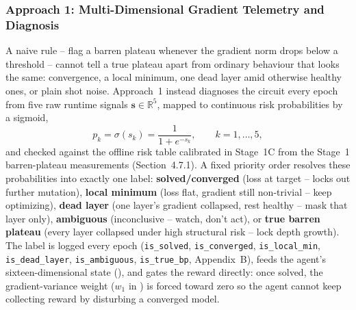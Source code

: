 \subsubsection{Approach 1: Multi-Dimensional Gradient Telemetry and Diagnosis}
A naive rule -- flag a barren plateau whenever the gradient norm drops below a threshold -- cannot tell a true plateau apart from ordinary behaviour that looks the same: convergence, a local minimum, one dead layer amid otherwise healthy ones, or plain shot noise. Approach~1 instead diagnoses the circuit every epoch from five raw runtime signals $\mathbf{s} \in \mathbb{R}^5$, mapped to continuous risk probabilities by a sigmoid,
\begin{equation}
p_k = \sigma(s_k) = \frac{1}{1+e^{-s_k}}, \qquad k = 1,\dots,5,
\end{equation}
and checked against the offline risk table calibrated in Stage~1C from the Stage~1 barren-plateau measurements (Section~4.7.1). A fixed priority order resolves these probabilities into exactly one label: \textbf{solved/converged} (loss at target -- locks out further mutation), \textbf{local minimum} (loss flat, gradient still non-trivial -- keep optimizing), \textbf{dead layer} (one layer's gradient collapsed, rest healthy -- mask that layer only), \textbf{ambiguous} (inconclusive -- watch, don't act), or \textbf{true barren plateau} (every layer collapsed under high structural risk -- lock depth growth). The label is logged every epoch (\texttt{is\_solved}, \texttt{is\_converged}, \texttt{is\_local\_min}, \texttt{is\_dead\_layer}, \texttt{is\_ambiguous}, \texttt{is\_true\_bp}, Appendix~B), feeds the agent's sixteen-dimensional state (), and gates the reward directly: once solved, the gradient-variance weight ($w_1$ in ) is forced toward zero so the agent cannot keep collecting reward by disturbing a converged model.

